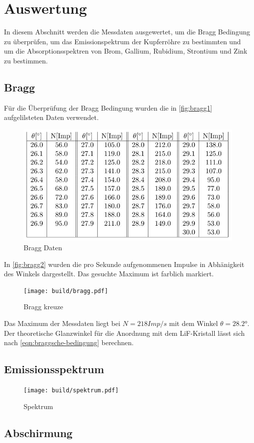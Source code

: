 \section{Auswertung}
\label{sec:Auswertung}
In diesem Abschnitt werden die Messdaten ausgewertet, um die Bragg Bedingung zu überprüfen, um das Emissionspektrum der Kupferröhre zu bestimmten und um die Absorptionsspektren von Brom, Gallium, Rubidium, Strontium und Zink zu bestimmen.
\subsection{Bragg}
Für die Überprüfung der Bragg Bedingung wurden die in \autoref{fig:bragg1} aufgelilsteten Daten verwendet.
\begin{figure}[H]
  \centering
  \includegraphics{daten/bragg.JPG}
  \caption{Bragg Daten}
  \label{fig:bragg1}
\end{figure}
In \autoref{fig:bragg2} wurden die pro Sekunde aufgenommenen Impulse in Abhänigkeit des Winkels dargestellt. Das gesuchte Maximum ist farblich markiert.
\begin{figure}[H]
  \centering
  \texttt{[image: build/bragg.pdf]}
  \caption{Bragg kreuze}
  \label{fig:bragg2}
\end{figure}
Das Maximum der Messdaten liegt bei $N=218 Imp/s$ mit dem Winkel $\theta=28.2°$. Der theoretische Glanzwinkel für die Anordnung mit dem LiF-Kristall lässt sich nach \autoref{eqn:braggsche-bedingung} berechnen.
\subsection{Emissionsspektrum}
\begin{figure}[H]
  \centering
  \texttt{[image: build/spektrum.pdf]}
  \caption{Spektrum}
  \label{fig:spektrum}
\end{figure}
\subsection{Abschirmung}

